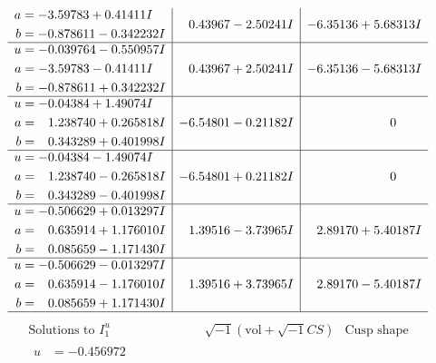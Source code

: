 \documentclass[1p]{elsarticle_modified}
\theoremstyle{definition}
\newcommand{\I}{\sqrt{-1}}
\begin{document}
$$\begin{array}{c|c|c}
\begin{aligned}
a &= -3.59783 + 0.41411 I \\
b &= -0.878611 - 0.342232 I\end{aligned}
 & \phantom{-}0.43967 - 2.50241 I & -6.35136 + 5.68313 I \\ \hline\begin{aligned}
u &= -0.039764 - 0.550957 I \\
a &= -3.59783 - 0.41411 I \\
b &= -0.878611 + 0.342232 I\end{aligned}
 & \phantom{-}0.43967 + 2.50241 I & -6.35136 - 5.68313 I \\ \hline\begin{aligned}
u &= -0.04384 + 1.49074 I \\
a &= \phantom{-}1.238740 + 0.265818 I \\
b &= \phantom{-}0.343289 + 0.401998 I\end{aligned}
 & -6.54801 - 0.21182 I & \phantom{-0.000000 } 0 \\ \hline\begin{aligned}
u &= -0.04384 - 1.49074 I \\
a &= \phantom{-}1.238740 - 0.265818 I \\
b &= \phantom{-}0.343289 - 0.401998 I\end{aligned}
 & -6.54801 + 0.21182 I & \phantom{-0.000000 } 0 \\ \hline\begin{aligned}
u &= -0.506629 + 0.013297 I \\
a &= \phantom{-}0.635914 + 1.176010 I \\
b &= \phantom{-}0.085659 - 1.171430 I\end{aligned}
 & \phantom{-}1.39516 - 3.73965 I & \phantom{-}2.89170 + 5.40187 I \\ \hline\begin{aligned}
u &= -0.506629 - 0.013297 I \\
a &= \phantom{-}0.635914 - 1.176010 I \\
b &= \phantom{-}0.085659 + 1.171430 I\end{aligned}
 & \phantom{-}1.39516 + 3.73965 I & \phantom{-}2.89170 - 5.40187 I\\
 \hline 
 \end{array}$$\newpage$$\begin{array}{c|c|c}  
\text{Solutions to }I^u_{1}& \I (\text{vol} + \sqrt{-1}CS) & \text{Cusp shape}\\
 \hline 
\begin{aligned}
u &= -0.456972\phantom{ +0.000000I} \\

\end{aligned}
\end{array}$$
\end{document}
